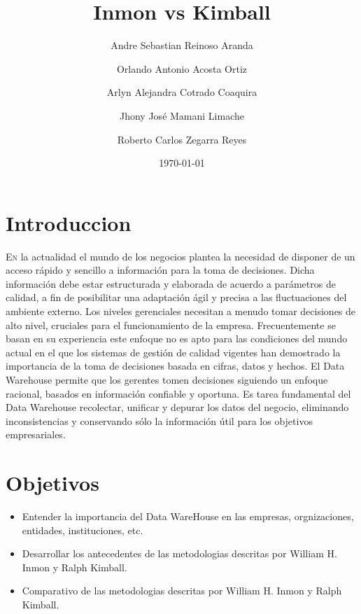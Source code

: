 \documentclass[twoside,twocolumn]{article}
\title{Inmon vs Kimball}
\author{Andre Sebastian Reinoso Aranda
 \and Orlando Antonio Acosta Ortiz \and Arlyn Alejandra Cotrado Coaquira \and Jhony José Mamani Limache \and Roberto Carlos Zegarra Reyes
}
\date{\today}
\begin{document}
\maketitle


\section{Introduccion}
\lettrine[nindent=0em,lines=3]{E}n la actualidad el mundo de los negocios plantea la necesidad de disponer de un acceso rápido y sencillo a información para la toma de decisiones. Dicha información debe estar estructurada y elaborada de acuerdo a parámetros de calidad, a fin de posibilitar una adaptación ágil y precisa a las fluctuaciones del ambiente externo.
Los niveles gerenciales necesitan a menudo tomar decisiones de alto nivel, cruciales para el funcionamiento de la empresa. Frecuentemente se basan en su experiencia este enfoque no es apto para las condiciones del mundo actual en el que los sistemas de gestión de calidad vigentes han demostrado la importancia de la toma de decisiones basada en cifras, datos y hechos. El Data Warehouse permite que los gerentes tomen decisiones siguiendo un enfoque racional, basados en información confiable y oportuna. Es tarea fundamental del Data Warehouse recolectar, unificar y depurar los datos del negocio, eliminando inconsistencias y conservando sólo la información útil para los objetivos empresariales.





\section{Objetivos}

\begin{itemize}
\item Entender la importancia del Data WareHouse en las empresas, orgnizaciones, entidades, instituciones, etc.
\item Desarrollar los antecedentes de las metodologias descritas por William H. Inmon y Ralph Kimball.
\item Comparativo de las metodologias descritas por William H. Inmon y Ralph Kimball.

\end{itemize}
\end{document}
